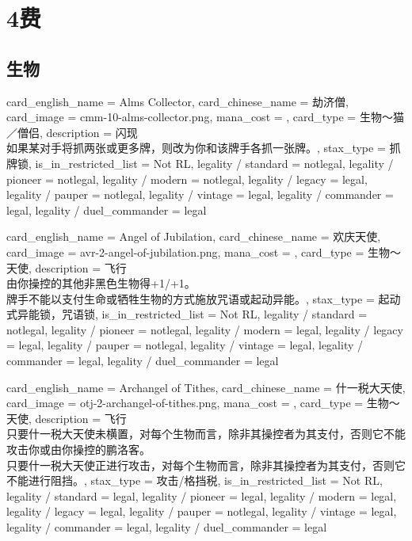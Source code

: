 \documentclass[lang = cn, color = black, 10pt]{AllThatStax}
\begin{document}
\chapter{4费}

\section{生物}

\card
{
	card_english_name = {Alms Collector},
	card_chinese_name = {劫济僧},
	card_image = cmm-10-alms-collector.png,
	mana_cost = ,
	card_type = 生物～猫／僧侣,
	description = {闪现\\
如果某对手将抓两张或更多牌，则改为你和该牌手各抓一张牌。},
	stax_type = 抓牌锁,
	is_in_restricted_list = Not RL,
	legality / standard = notlegal,
	legality / pioneer = notlegal,
	legality / modern = notlegal,
	legality / legacy = legal,
	legality / pauper = notlegal,
	legality / vintage = legal,
	legality / commander = legal,
	legality / duel_commander = legal
}

\card
{
	card_english_name = {Angel of Jubilation},
	card_chinese_name = {欢庆天使},
	card_image = avr-2-angel-of-jubilation.png,
	mana_cost = ,
	card_type = 生物～天使,
	description = {飞行\\
由你操控的其他非黑色生物得+1/+1。\\
牌手不能以支付生命或牺牲生物的方式施放咒语或起动异能。},
	stax_type = 起动式异能锁，咒语锁,
	is_in_restricted_list = Not RL,
	legality / standard = notlegal,
	legality / pioneer = notlegal,
	legality / modern = legal,
	legality / legacy = legal,
	legality / pauper = notlegal,
	legality / vintage = legal,
	legality / commander = legal,
	legality / duel_commander = legal
}

\card
{
	card_english_name = {Archangel of Tithes},
	card_chinese_name = {什一税大天使},
	card_image = otj-2-archangel-of-tithes.png,
	mana_cost = ,
	card_type = 生物～天使,
	description = {飞行\\
只要什一税大天使未横置，对每个生物而言，除非其操控者为其支付，否则它不能攻击你或由你操控的鹏洛客。\\
只要什一税大天使正进行攻击，对每个生物而言，除非其操控者为其支付，否则它不能进行阻挡。},
	stax_type = 攻击/格挡税,
	is_in_restricted_list = Not RL,
	legality / standard = legal,
	legality / pioneer = legal,
	legality / modern = legal,
	legality / legacy = legal,
	legality / pauper = notlegal,
	legality / vintage = legal,
	legality / commander = legal,
	legality / duel_commander = legal
}
\end{document}
